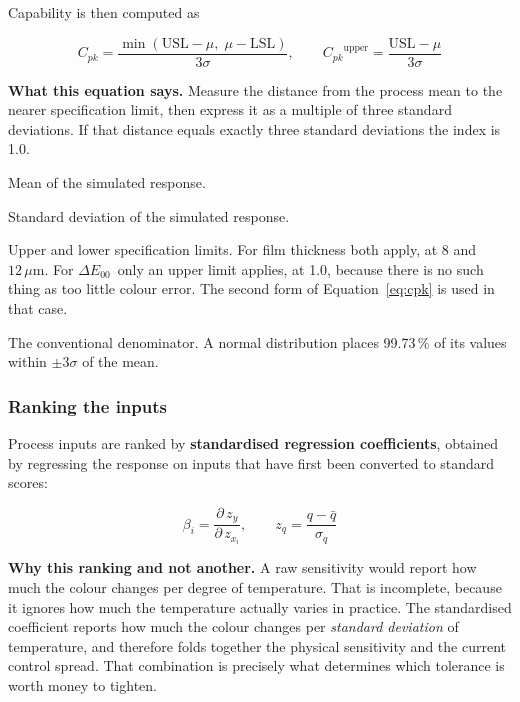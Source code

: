 \documentclass[11pt,a4paper]{article}
\newcommand{\dE}{\ensuremath{\Delta E_{00}}}
\newcommand{\Cpk}{\ensuremath{C_{pk}}}
\newcommand{\um}{\ensuremath{\,\mu\mathrm{m}}}
\newenvironment{symlist}
  {\vspace{-0.2em}\begin{list}{}{%
    \setlength{\leftmargin}{2.4em}\setlength{\labelwidth}{2.0em}%
    \setlength{\labelsep}{0.4em}\setlength{\itemsep}{1pt}%
    \setlength{\parsep}{0pt}\setlength{\topsep}{3pt}%
    \renewcommand{\makelabel}[1]{##1\hfil}}}
  {\end{list}}
\begin{document}
Capability is then computed as

\begin{equation}
\Cpk = \frac{\min\left(\mathrm{USL} - \mu,\; \mu - \mathrm{LSL}\right)}{3\sigma},
\qquad
\Cpk^{\mathrm{upper}} = \frac{\mathrm{USL} - \mu}{3\sigma}
\label{eq:cpk}
\end{equation}

\noindent\textbf{What this equation says.} Measure the distance from the
process mean to the nearer specification limit, then express it as a multiple
of three standard deviations. If that distance equals exactly three standard
deviations the index is 1.0.

\begin{symlist}
\item[$\mu$] Mean of the simulated response.
\item[$\sigma$] Standard deviation of the simulated response.
\item[USL, LSL] Upper and lower specification limits. For film thickness both
apply, at 8 and $12\um$. For \dE\ only an upper limit applies, at 1.0, because
there is no such thing as too little colour error. The second form of
Equation~\eqref{eq:cpk} is used in that case.
\item[$3\sigma$] The conventional denominator. A normal distribution places
99.73\,\% of its values within $\pm 3\sigma$ of the mean.
\end{symlist}

\subsubsection{Ranking the inputs}

Process inputs are ranked by \textbf{standardised regression coefficients},
obtained by regressing the response on inputs that have first been converted to
standard scores:

\begin{equation}
\beta_i = \frac{\partial\, z_y}{\partial\, z_{x_i}},
\qquad
z_q = \frac{q - \bar{q}}{\sigma_q}
\label{eq:beta}
\end{equation}

\noindent\textbf{Why this ranking and not another.} A raw sensitivity would
report how much the colour changes per degree of temperature. That is
incomplete, because it ignores how much the temperature actually varies in
practice. The standardised coefficient reports how much the colour changes per
\emph{standard deviation} of temperature, and therefore folds together the
physical sensitivity and the current control spread. That combination is
precisely what determines which tolerance is worth money to tighten.
\end{document}
